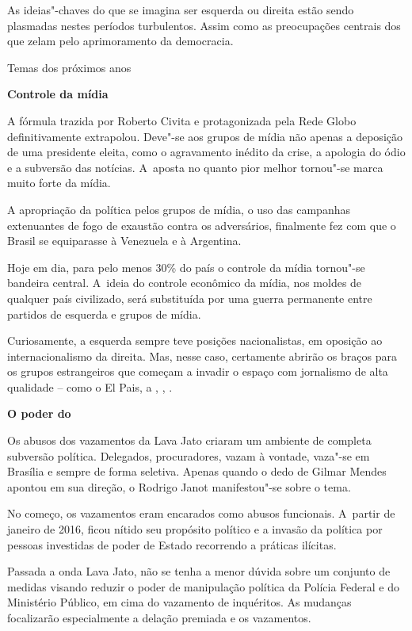 As ideias"-chaves do que se imagina ser esquerda ou direita estão sendo
plasmadas nestes períodos turbulentos. Assim como as preocupações
centrais dos que zelam pelo aprimoramento da democracia.

Temas dos próximos anos

\textbf{Controle da mídia}

A fórmula trazida por Roberto Civita e protagonizada pela Rede Globo
definitivamente extrapolou. Deve"-se aos grupos de mídia não apenas a
deposição de uma presidente eleita, como o agravamento inédito da crise,
a apologia do ódio e a subversão das notícias. A~aposta no quanto pior
melhor tornou"-se marca muito forte da mídia.

 A apropriação da política pelos grupos de mídia, o uso das campanhas
extenuantes de fogo de exaustão contra os adversários, finalmente fez
com que o Brasil se equiparasse à Venezuela e à Argentina.

Hoje em dia, para pelo menos 30\% do país o controle da mídia tornou"-se
bandeira central. A~ideia do controle econômico da mídia, nos moldes de
qualquer país civilizado, será substituída por uma guerra permanente
entre partidos de esquerda e grupos de mídia.

Curiosamente, a esquerda sempre teve posições nacionalistas, em oposição
ao internacionalismo da direita. Mas, nesse caso, certamente abrirão os
braços para os grupos estrangeiros que começam a invadir o espaço com
jornalismo de alta qualidade -- como o El Pais, a , , .

\textbf{O poder do }

Os abusos dos vazamentos da Lava Jato criaram um ambiente de completa
subversão política. Delegados, procuradores, vazam à vontade, vaza"-se em
Brasília e sempre de forma seletiva. Apenas quando o dedo de Gilmar
Mendes apontou em sua direção, o  Rodrigo Janot manifestou"-se sobre o
tema.

No começo, os vazamentos eram encarados como abusos funcionais. A~partir
de janeiro de 2016, ficou nítido seu propósito político e a invasão da
política por pessoas investidas de poder de Estado recorrendo a práticas
ilícitas.

Passada a onda Lava Jato, não se tenha a menor dúvida sobre um conjunto
de medidas visando reduzir o poder de manipulação política da Polícia
Federal e do Ministério Público, em cima do vazamento de inquéritos. As
mudanças focalizarão especialmente a delação premiada e os vazamentos.

